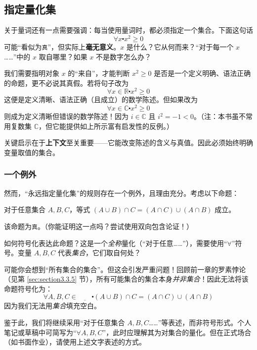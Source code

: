 \subsection{指定量化集}

关于量词还有一点需要强调：每当使用量词时，都必须指定一个集合。下面这句话
\[\forall x \centerdot x^2 \ge 0\]
可能``看似为\verb|真|''，但实际上\textbf{毫无意义}。$x$ 是什么？它从何而来？``对于每一个 $x$……''中的 $x$ 取自哪里？如果 $x$ 不是数字怎么办？

我们需要指明对象 $x$ 的``来自''，才能判断 $x^2 \ge 0$ 是否是一个定义明确、语法正确的命题，更不必说其真假。若将句子改为
\[\forall x \in \mathbb{R} \centerdot x^2 \ge 0\]
这便是定义清晰、语法正确（且成立）的数学陈述。但如果改为
\[\forall x \in \mathbb{C} \centerdot x^2 \ge 0\]
则成为定义清晰但错误的数学陈述！因为 $i \in \mathbb{C}$ 且 $i^2 = -1 < 0$。（注：本书虽不常用复数集 $\mathbb{C}$，但它能提供如上所示富有启发性的反例。）

关键启示在于\textbf{上下文}至关重要——它能改变陈述的含义与真值。因此必须始终明确变量取值的集合。

\subsubsection*{一个例外}

然而，``永远指定量化集''的规则存在一个例外，且理由充分。考虑以下命题：
\begin{center}
    对于任意集合 $A, B,C$，等式 $(A \cup B) \cap C = (A \cap C) \cup (A \cap B)$ 成立。
\end{center}
该命题为\verb|真|。（你能证明这一点吗？尝试使用双向包含论证！）

如何符号化表达此命题？这是一个\emph{全称}量化（``对于任意……''），需要使用``$\forall$''符号。变量 $A,B,C$ 代表\emph{集合}，它们取自何处？

可能你会想到``所有集合的集合''。但这会引发严重问题！回顾前一章的罗素悖论（见第 \ref{sec:section3.3.5} 节），所有可能集合的集合本身\emph{并非集合}！因此无法将该命题符号化为：
\[\forall A, B,C \in \underline{\qquad} \centerdot (A \cup B) \cap C = (A \cap C) \cup (A \cap B)\]
因为我们无法用\emph{集合}填充空白。

鉴于此，我们将继续采用``对于任意集合 $A,B,C$……''等表述，而非符号形式。个人笔记或草稿中可简写为``$\forall A,B,C$''，此时应理解其为对集合的量化。但在正式场合（如书面作业），请使用上述文字表述的方式。

\clearpage
